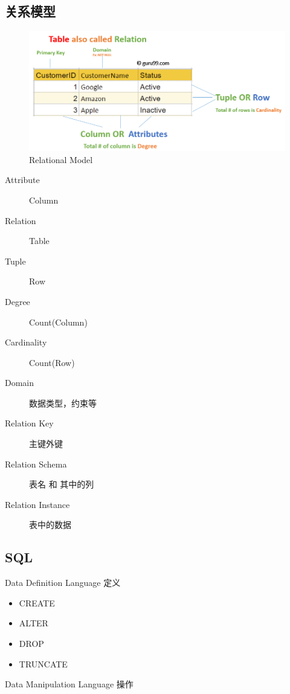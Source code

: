 \documentclass[11pt,journal,compsoc]{IEEEtran}
\begin{document}
\subsection{关系模型}

\begin{figure}[H]
    \centering
    \includegraphics[width=\linewidth]{RelationalModel.jpg}
    \caption{Relational Model}
\end{figure}

\begin{description}
    \item[Attribute] Column
    \item[Relation] Table
    \item[Tuple] Row
    \item[Degree] Count(Column)
    \item[Cardinality] Count(Row)
    \item[Domain] 数据类型，约束等
    \item[Relation Key] 主键外键
    \item[Relation Schema] 表名 和 其中的列
    \item[Relation Instance] 表中的数据
\end{description}


\subsection{SQL}

Data Definition Language 定义

\begin{itemize}
    \item CREATE
    \item ALTER
    \item DROP
    \item TRUNCATE
\end{itemize}

Data Manipulation Language 操作
\end{document}
